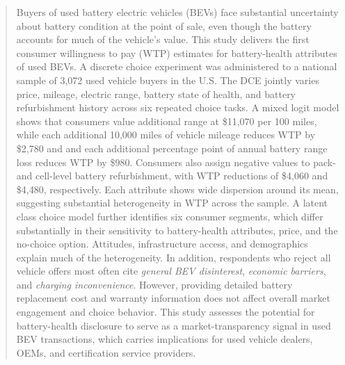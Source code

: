 \documentclass[a4paper,fleqn]{cas-sc}   %
\begin{document}
\begin{abstract}
Buyers of used battery electric vehicles (BEVs) face substantial uncertainty about battery condition at the point of sale, even though the battery accounts for much of the vehicle's value. This study delivers the first consumer willingness to pay (WTP) estimates for battery-health attributes of used BEVs. A discrete choice experiment was administered to a national sample of 3,072 used vehicle buyers in the U.S. The DCE jointly varies price, mileage, electric range, battery state of health, and battery refurbishment history across six repeated choice tasks. A mixed logit model shows that consumers value additional range at \$11,070 per 100 miles, while each additional 10,000 miles of vehicle mileage reduces WTP by \$2,780 and and each additional percentage point of annual battery range loss reduces WTP by \$980. Consumers also assign negative values to pack- and cell-level battery refurbishment, with WTP reductions of \$4,060 and \$4,480, respectively. Each attribute shows wide dispersion around its mean, suggesting substantial heterogeneity in WTP across the sample. A latent class choice model further identifies six consumer segments, which differ substantially in their sensitivity to battery-health attributes, price, and the no-choice option. Attitudes, infrastructure access, and demographics explain much of the heterogeneity. In addition, respondents who reject all vehicle offers most often cite \textit{general BEV disinterest}, \textit{economic barriers}, and \textit{charging inconvenience}. However, providing detailed battery replacement cost and warranty information does not affect overall market engagement and choice behavior. This study assesses the potential for battery-health disclosure to serve as a market-transparency signal in used BEV transactions, which carries implications for used vehicle dealers, OEMs, and certification service providers.

\end{abstract}

\end{document}
